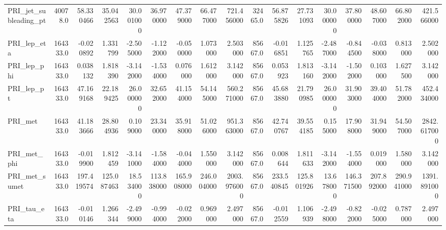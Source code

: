 \begin{table}[ht]
\begin{tabular}{lrrrrrrrrrrrrrrrr}
		PRI\_jet\_subleading\_pt       &   40078.0 &      58.330466 &     35.042563 &      30.001000 &      36.970000 &      47.379000 &      66.477000 &     721.456000 &  32465.0 &      56.875826 &     27.731093 &      30.000000 &      37.800000 &      48.607000 &      66.802000 &     421.566000 \\
		PRI\_lep\_eta                 &  164333.0 &      -0.020892 &      1.331799 &      -2.505000 &      -1.122000 &      -0.050000 &       1.073000 &       2.503000 &  85667.0 &      -0.016851 &      1.125765 &      -2.487000 &      -0.844500 &      -0.038000 &       0.813000 &       2.502000 \\
		PRI\_lep\_phi                 &  164333.0 &       0.038132 &      1.818390 &      -3.142000 &      -1.534000 &       0.076000 &       1.612000 &       3.142000 &  85667.0 &       0.053923 &      1.813160 &      -3.142000 &      -1.502000 &       0.103000 &       1.627500 &       3.142000 \\
		PRI\_lep\_pt                  &  164333.0 &      47.169168 &     22.189425 &      26.000000 &      32.652000 &      41.154000 &      54.145000 &     560.271000 &  85667.0 &      45.683880 &     21.790985 &      26.000000 &      31.903000 &      39.404000 &      51.782000 &     452.434000 \\
		PRI\_met                     &  164333.0 &      41.183666 &     28.804936 &       0.109000 &      23.340000 &      35.918000 &      51.026000 &     951.363000 &  85667.0 &      42.740767 &     39.554185 &       0.155000 &      17.908000 &      31.949000 &      54.507000 &    2842.617000 \\
		PRI\_met\_phi                 &  164333.0 &      -0.019900 &      1.812459 &      -3.141000 &      -1.584000 &      -0.044000 &       1.550000 &       3.142000 &  85667.0 &       0.008644 &      1.811633 &      -3.142000 &      -1.554000 &       0.019000 &       1.580000 &       3.142000 \\
		PRI\_met\_sumet               &  164333.0 &     197.419574 &    125.087463 &      18.534000 &     113.838000 &     165.908000 &     246.004000 &    2003.976000 &  85667.0 &     233.540845 &    125.801926 &      13.678000 &     146.371500 &     207.892000 &     290.941000 &    1391.891000 \\
		PRI\_tau\_eta                 &  164333.0 &      -0.010146 &      1.266344 &      -2.499000 &      -0.994000 &      -0.022000 &       0.969000 &       2.497000 &  85667.0 &      -0.012559 &      1.106939 &      -2.498000 &      -0.822000 &      -0.025000 &       0.787000 &       2.497000 \\

\end{tabular}
\end{table}

